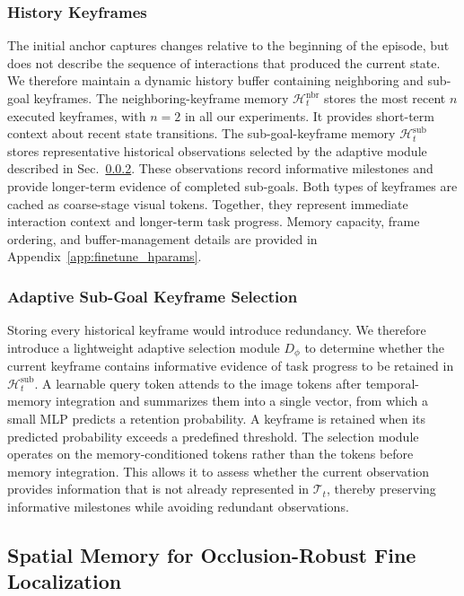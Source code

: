 \subsubsection{History Keyframes}
\label{sec:memmethod:bank}

The initial anchor captures changes relative to the beginning of the episode,
but does not describe the sequence of interactions that produced the current
state.
We therefore maintain a dynamic history buffer containing neighboring and
sub-goal keyframes.
The neighboring-keyframe memory
$\mathcal{H}^{\mathrm{nbr}}_t$ stores the most recent $n$ executed
keyframes, with $n=2$ in all our experiments.
It provides short-term context about recent state transitions.
The sub-goal-keyframe memory
$\mathcal{H}^{\mathrm{sub}}_t$ stores representative historical
observations selected by the adaptive module described in
Sec.~\ref{sec:memmethod:gate}.
These observations record informative milestones and provide longer-term
evidence of completed sub-goals.
Both types of keyframes are cached as coarse-stage visual tokens.
Together, they represent immediate interaction context and longer-term task
progress.
Memory capacity, frame ordering, and buffer-management details are provided
in Appendix~\ref{app:finetune_hparams}.


\subsubsection{Adaptive Sub-Goal Keyframe Selection}
\label{sec:memmethod:gate}

Storing every historical keyframe would introduce redundancy.
We therefore introduce a lightweight adaptive selection module
$D_{\phi}$ to determine whether the current keyframe contains
informative evidence of task progress to be retained in
$\mathcal{H}^{\mathrm{sub}}_t$.
A learnable query token attends to the image tokens after temporal-memory
integration and summarizes them into a single vector, from which a small MLP
predicts a retention probability.
A keyframe is retained when its predicted probability exceeds a predefined
threshold.
The selection module operates on the memory-conditioned tokens
rather than the tokens before memory integration.
This allows it to assess whether the current observation provides information
that is not already represented in $\mathcal{T}_t$, thereby preserving
informative milestones while avoiding redundant observations.

\subsection{Spatial Memory for Occlusion-Robust Fine Localization}
\label{sec:memmethod:spatial}

